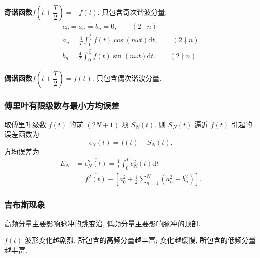 \textbf{奇谐函数}\quad $f\left(t\pm\dfrac{T}{2}\right)=-f(t)$. 只包含奇次谐波分量.
\srmg
\begin{gather}
    a_0=a_n=b_n=0,\qquad (2\mid n) \\
    a_n=\frac{4}{T}\int_{0}^{\frac{T}{2}}f(t)\cos(n\omega t)\mathrm{d}t,\qquad (2\nmid n) \\
    b_n=\frac{4}{T}\int_{0}^{\frac{T}{2}}f(t)\sin(n\omega t)\mathrm{d}t.\qquad (2\nmid n)
\end{gather}

\textbf{偶谐函数}\quad $f\left(t\pm\dfrac{T}{2}\right)=f(t)$. 只包含偶次谐波分量.

\subsubsection{傅里叶有限级数与最小方均误差}
取傅里叶级数 $f(t)$ 的前 $(2N+1)$ 项 $S_N(t)$. 则 $S_N(t)$ 逼近 $f(t)$ 引起的误差函数为
\begin{equation}
    \epsilon_N(t)=f(t)-S_N(t).
\end{equation}
方均误差为
\begin{equation}
    \begin{aligned}
        E_N & =\overline{\epsilon_N^2(t)}=\frac{1}{T}\int_{0}^{T}\epsilon_N^2(t)\mathrm{d}t \\
            & =\overline{f^2(t)}-\left[a_0^2+\frac{1}{2}\sum_{n=1}^{N}(a_n^2+b_n^2)\right].
    \end{aligned}
\end{equation}

\subsubsection{吉布斯现象}
高频分量主要影响脉冲的跳变沿, 低频分量主要影响脉冲的顶部.

$f(t)$ 波形变化越剧烈, 所包含的高频分量越丰富; 变化越缓慢, 所包含的低频分量越丰富.
